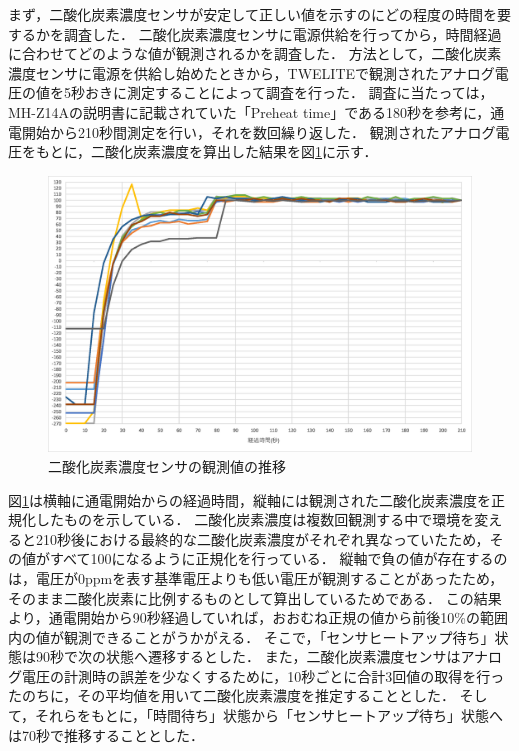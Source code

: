 まず，二酸化炭素濃度センサが安定して正しい値を示すのにどの程度の時間を要するかを調査した．
二酸化炭素濃度センサに電源供給を行ってから，時間経過に合わせてどのような値が観測されるかを調査した．
方法として，二酸化炭素濃度センサに電源を供給し始めたときから，TWELITEで観測されたアナログ電圧の値を5秒おきに測定することによって調査を行った．
調査に当たっては，MH-Z14Aの説明書に記載されていた「Preheat time」である180秒を参考に，通電開始から210秒間測定を行い，それを数回繰り返した．
観測されたアナログ電圧をもとに，二酸化炭素濃度を算出した結果を図\ref{graph_co2_wait}に示す．
\begin{figure}[htbp]
    \centering
    \includegraphics[width = 15cm]{./picture/co2_wait_graph.eps}
    \caption{二酸化炭素濃度センサの観測値の推移}
    \label{graph_co2_wait}
\end{figure}
図\ref{graph_co2_wait}は横軸に通電開始からの経過時間，縦軸には観測された二酸化炭素濃度を正規化したものを示している．
二酸化炭素濃度は複数回観測する中で環境を変えると210秒後における最終的な二酸化炭素濃度がそれぞれ異なっていたため，その値がすべて100になるように正規化を行っている．
縦軸で負の値が存在するのは，電圧が0ppmを表す基準電圧よりも低い電圧が観測することがあったため，そのまま二酸化炭素に比例するものとして算出しているためである．
この結果より，通電開始から90秒経過していれば，おおむね正規の値から前後10\%の範囲内の値が観測できることがうかがえる．
そこで，「センサヒートアップ待ち」状態は90秒で次の状態へ遷移するとした．
また，二酸化炭素濃度センサはアナログ電圧の計測時の誤差を少なくするために，10秒ごとに合計3回値の取得を行ったのちに，その平均値を用いて二酸化炭素濃度を推定することとした．
そして，それらをもとに，「時間待ち」状態から「センサヒートアップ待ち」状態へは70秒で推移することとした．

